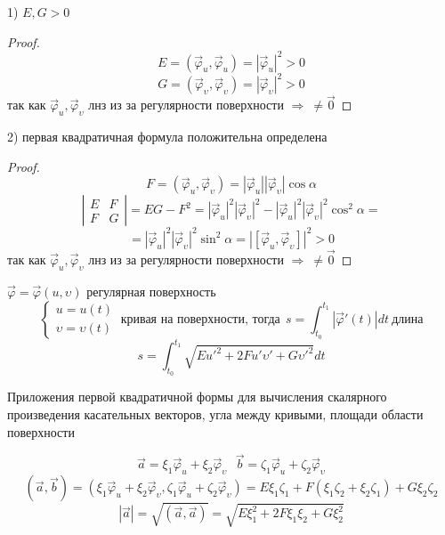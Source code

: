 \begin{block}[Свойства]
  1) $E,G > 0$

  \begin{proof}
    $$
    E = (\vec \varphi_u, \vec \varphi_u) = |\vec \varphi_u|^2 > 0
    $$
    $$
    G = (\vec \varphi_{\upsilon}, \vec \varphi_{\upsilon}) =
    |\vec \varphi_{\upsilon}|^2 > 0
    $$
    так как $\vec \varphi_u, \vec \varphi_{\upsilon}$ лнз из за регулярности
    поверхности $\Rightarrow ~ \not= \vec 0$
  \end{proof}

  2) первая квадратичная формула положительна определена

  \begin{proof}
    $$
    F = (\vec \varphi_u, \vec \varphi_{\upsilon}) = |\vec \varphi_u|
    |\vec \varphi_{\upsilon}| \cos \alpha
    $$
    $$
    \left|
    \begin{array}{cc}
      E & F \\
      F & G
    \end{array}
    \right|
    = EG - F^2 = |\vec \varphi_u|^2|\vec \varphi_{\upsilon}|^2 -
    |\vec \varphi_u|^2 |\vec \varphi_{\upsilon}|^2 \cos^2 \alpha =
    $$
    $$
    = |\vec \varphi_u|^2
    |\vec \varphi_{\upsilon}|^2 \sin^2 \alpha = |[\vec \varphi_u, \vec
    \varphi_{\upsilon}]|^2 > 0
    $$
    так как $\vec \varphi_u, \vec \varphi_{\upsilon}$ лнз из за регулярности
    поверхности $\Rightarrow ~ \not= \vec 0$
  \end{proof}
\end{block}

\begin{block}
  $\vec \varphi = \vec \varphi(u, \upsilon)$ регулярная поверхность
  $$
  \left\{
    \begin{array}{l}
      u = u(t) \\
      \upsilon = \upsilon(t)
    \end{array}
  \right. ~ \text{кривая на поверхности, тогда} ~~
  s = \int_{t_0}^{t_1} |\vec \varphi'(t)| dt ~ \text{длина}
  $$
  $$
  s = \int_{t_0}^{t_1} \sqrt{E u'^2 + 2Fu'\upsilon' + G\upsilon'^2}dt
  $$
\end{block}

\begin{title}[\Large]
  Приложения первой квадратичной формы для вычисления скалярного произведения
  касательных векторов, угла между кривыми, площади области поверхности
\end{title}

\begin{block}
  $$
  \vec a = \xi_1 \vec \varphi_u + \xi_2 \vec \varphi_{\upsilon} ~~~
  \vec b = \zeta_1 \vec \varphi_u + \zeta_2 \vec \varphi_{\upsilon}
  $$
  $$
  (\vec a, \vec b) = (\xi_1 \vec \varphi_u + \xi_2 \vec \varphi_{\upsilon},
  \zeta_1 \vec \varphi_u + \zeta_2 \vec \varphi_{\upsilon}) =
  E \xi_1 \zeta_1 + F(\xi_1 \zeta_2 + \xi_2 \zeta_1) + G\xi_2 \zeta_2
  $$
  $$
  |\vec a| = \sqrt{(\vec a, \vec a)} = \sqrt{E\xi_1^2 + 2F\xi_1 \xi_2 +
  G\xi_2^2}
  $$
\end{block}

